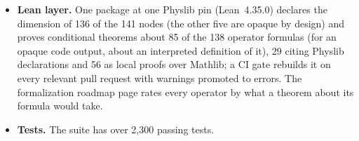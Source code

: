 \documentclass[11pt,a4paper]{article}
\begin{document}
\begin{itemize}[leftmargin=2em, itemsep=0.25em]
        each a density in frequency), the eleven analog-device-metrology
        closed forms, the NEMD interface conductance, the two cure-kinetics
        edges and the two molecular ideal-gas heat capacities, harmonic and quasi-RRHO.
  \item \textbf{Lean layer.} One package at one Physlib pin (Lean~4.35.0)
        declares the dimension of 136 of the 141 nodes (the other five are
        opaque by design) and proves conditional theorems about 85 of the 138
        operator formulas (for an opaque code output, about an interpreted
        definition of it), 29 citing Physlib declarations and 56 as local proofs over
        Mathlib; a CI gate rebuilds it on every relevant pull request
        with warnings promoted to errors. The formalization roadmap page rates
        every operator by what a theorem about its formula would take.
  \item \textbf{Tests.} The suite has over 2,300 passing tests.
\end{itemize}
\end{document}
